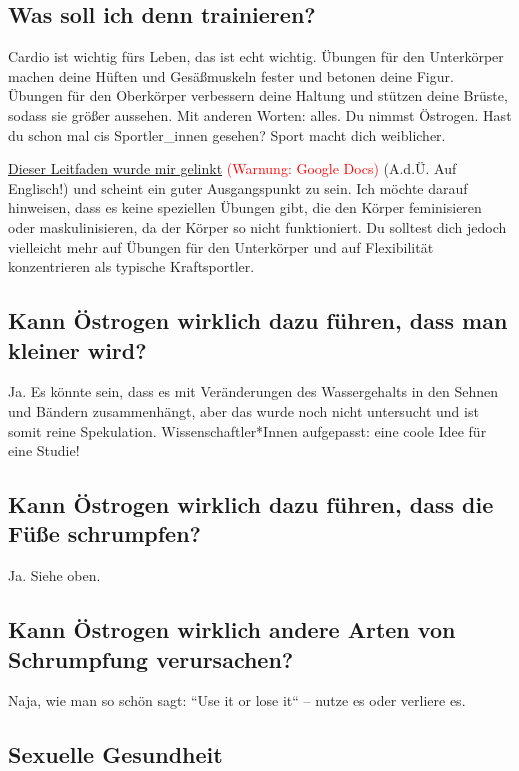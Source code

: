 \documentclass{article}
\begin{document}
\subsection{Was soll ich denn trainieren?}\label{11-16}

Cardio ist wichtig fürs Leben, das ist echt wichtig. Übungen für den Unterkörper machen deine Hüften und Gesäßmuskeln fester und betonen deine Figur. Übungen für den Oberkörper verbessern deine Haltung und stützen deine Brüste, sodass sie größer aussehen. Mit anderen Worten: alles. Du nimmst Östrogen. Hast du schon mal cis Sportler\_innen gesehen? Sport macht dich weiblicher.

\href{https://docs.google.com/document/d/1-NyE5EY5TTaRRMhk7HlTbKJ7HifjEsA4jlDO1qKQVl0/edit?tab=t.0}{Dieser Leitfaden wurde mir gelinkt} \textcolor{red}{(Warnung: Google Docs)} (A.d.Ü. Auf Englisch!) und scheint ein guter Ausgangspunkt zu sein. Ich möchte darauf hinweisen, dass es keine speziellen Übungen gibt, die den Körper feminisieren oder maskulinisieren, da der Körper so nicht funktioniert. Du solltest dich jedoch vielleicht mehr auf Übungen für den Unterkörper und auf Flexibilität konzentrieren als typische Kraftsportler.

\subsection{Kann Östrogen wirklich dazu führen, dass man kleiner wird?}

Ja. Es könnte sein, dass es mit Veränderungen des Wassergehalts in den Sehnen und Bändern zusammenhängt, aber das wurde noch nicht untersucht und ist somit reine Spekulation. Wissenschaftler*Innen aufgepasst: eine coole Idee für eine Studie!

\subsection{Kann Östrogen wirklich dazu führen, dass die Füße schrumpfen?}

Ja. Siehe oben.

\subsection{Kann Östrogen wirklich andere Arten von Schrumpfung verursachen?}

Naja, wie man so schön sagt: “Use it or lose it“ – nutze es oder verliere es.

\subsection*{Sexuelle Gesundheit}
\end{document}

